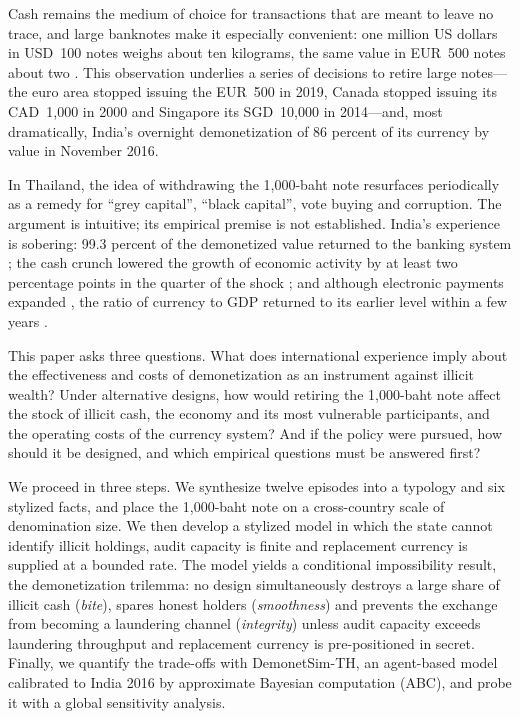 \documentclass[11pt]{article}
\theoremstyle{definition}
\theoremstyle{remark}
\begin{document}
Cash remains the medium of choice for transactions that are meant to leave no trace, and large banknotes make it
especially convenient: one million US dollars in USD~100 notes weighs about ten kilograms, the same value in EUR~500
notes about two \citep{sands2016,rogoff2016}. This observation underlies a series of decisions to retire large notes---the
euro area stopped issuing the EUR~500 in 2019, Canada stopped issuing its CAD~1,000 in 2000 and Singapore its SGD~10,000
in 2014---and, most dramatically, India's overnight demonetization of 86 percent of its currency by value in November 2016.

In Thailand, the idea of withdrawing the 1,000-baht note resurfaces periodically as a remedy for ``grey capital'', ``black
capital'', vote buying and corruption. The argument is intuitive; its empirical premise is not established. India's
experience is sobering: 99.3 percent of the demonetized value returned to the banking system \citep{rbi2018}; the cash
crunch lowered the growth of economic activity by at least two percentage points in the quarter of the shock
\citep{chodorowreich2020}; and although electronic payments expanded \citep{crouzet2023}, the ratio of currency to GDP
returned to its earlier level within a few years \citep{lahiri2020}.

This paper asks three questions. What does international experience imply about the effectiveness and costs of
demonetization as an instrument against illicit wealth? Under alternative designs, how would retiring the 1,000-baht note
affect the stock of illicit cash, the economy and its most vulnerable participants, and the operating costs of the
currency system? And if the policy were pursued, how should it be designed, and which empirical questions must be answered
first?

We proceed in three steps. We synthesize twelve episodes into a typology and six stylized facts, and place the 1,000-baht
note on a cross-country scale of denomination size. We then develop a stylized model in which the state cannot identify
illicit holdings, audit capacity is finite and replacement currency is supplied at a bounded rate. The model yields a
conditional impossibility result, the demonetization trilemma: no design simultaneously destroys a large share of illicit
cash (\textit{bite}), spares honest holders (\textit{smoothness}) and prevents the exchange from becoming a laundering
channel (\textit{integrity}) unless audit capacity exceeds laundering throughput and replacement currency is
pre-positioned in secret. Finally, we quantify the trade-offs with DemonetSim-TH, an agent-based model calibrated to India
2016 by approximate Bayesian computation (ABC), and probe it with a global sensitivity analysis.
\end{document}
